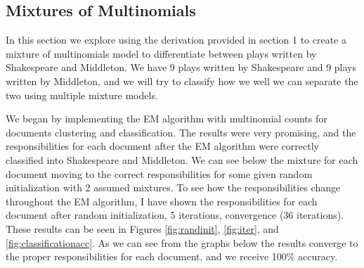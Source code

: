\documentclass[paper=a4, fontsize=11pt]{scrartcl} %
\begin{document}
\subsection{Mixtures of Multinomials}
In this section we explore using the derivation provided in section 1 to create a mixture of multinomials model to differentiate between plays written by Shakespeare and Middleton.
We have 9 plays written by Shakespeare and 9 plays written by Middleton, and we will try to classify how we well we can separate the two using multiple mixture models.


We began by implementing the EM algorithm with multinomial counts for documents clustering and classification.  
The results were very promising, and the responsibilities for each document after the EM algorithm were correctly classified into Shakespeare and Middleton.
We can see below the mixture for each document moving to the correct responsibilities for some given random initialization with 2 assumed mixtures.  
To see how the responsibilities change throughout the EM algorithm, I have shown the responsibilities for each document after random initialization, 5 iterations, convergence (36 iterations).
These results can be seen in Figures \ref{fig:randinit}, \ref{fig:iter}, and \ref{fig:classificationacc}.
As we can see from the graphs below the results converge to the proper responsibilities for each document, and we receive 100\% accuracy.
\end{document}
